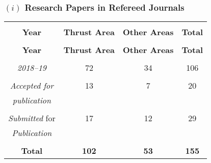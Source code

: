 \subsubsection{\!\!}

\subsubsection*{{\small $(i)$ {\sc Research Papers in Refereed Journals}}}
\medskip

\begin{center}
	\begin{longtable}{|c|c|c|c|}

		\hline
		                    &                   &                   &                            \\[-4mm]
		{\bf Year}          & {\bf Thrust Area} & {\bf Other Areas} & {\bf Total}                \\[.4mm]\hline
		\endfirsthead

		\hline
		                    &                   &                   &                            \\[-4mm]
		{\bf Year}          & {\bf Thrust Area} & {\bf Other Areas} & {\bf Total} \hspace{1.1cm} \\[.4mm]\hline
		\endhead

		                    &                   &                   &                            \\[-4mm]
		{\em 2018--19}      & 72                & 34                & 106                        \\[.4mm]\hline
		                    &                   &                   &                            \\[-4mm]
		{\em Accepted for}  & 13                & 7                 & 20                         \\
		{\em publication}   &                   &                   &                            \\[0.4mm]\hline
		                    &                   &                   &                            \\[-4mm]
		{\em Submitted} for & 17                & 12                & 29                         \\
		{\em Publication}   &                   &                   &                            \\[0.4mm]\hline
		                    &                   &                   &                            \\[-4mm]
		{\bf Total}         & {\bf 102}         & {\bf 53}          & {\bf 155}                  \\[0.4mm]\hline
	\end{longtable}
\end{center}

